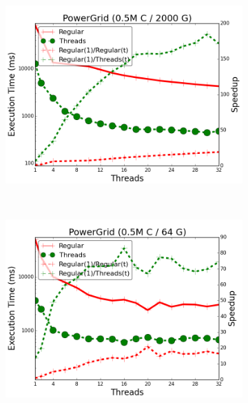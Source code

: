 \begin{figure}[]
        \centering
        \begin{subfigure}[b]{\plotsize\textwidth}
           \includegraphics[width=\textwidth]{experiments/threads/cmp-powergrid-500000C2000G.png}
           \caption{}
           \label{fig:threads:powergrid1}
        \end{subfigure}
        ~
        \begin{subfigure}[b]{\plotsize\textwidth}
           \includegraphics[width=\textwidth]{experiments/threads/cmp-powergrid-500000C64G.png}
           \caption{}
           \label{fig:threads:powergrid2}
        \end{subfigure} \\

\end{figure}
